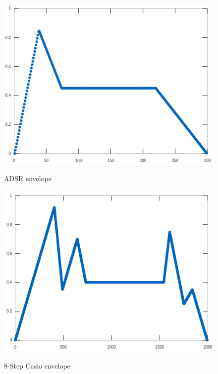 \documentclass[runningheads]{llncs}
\begin{document}
\begin{figure}[!htb]
    \centering
    \begin{minipage}{0.45\textwidth}
        \centering
        \includegraphics[scale=.25]{env1.png}
        \caption{ADSR envelope}
        \label{fig:adsr}
    \end{minipage}\hfill
    \begin{minipage}{0.45\textwidth}
        \label{env2}
        \centering
        \includegraphics[scale=.25]{env2.png}
        \caption{8-Step Casio envelope}
        \label{fig:casio}
    \end{minipage}
\end{figure}
\end{document}
